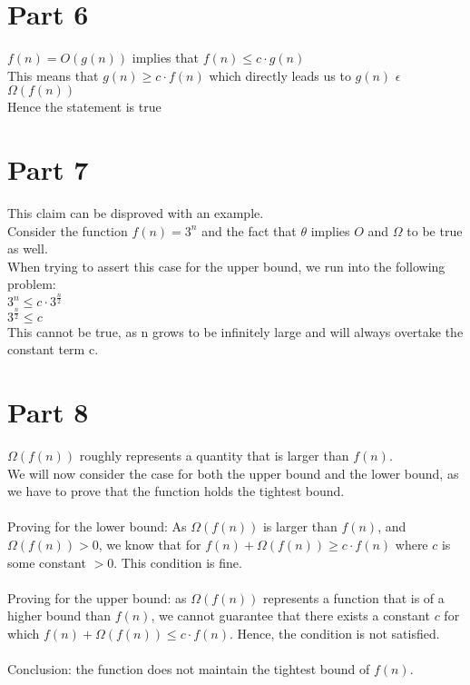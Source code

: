 \documentclass[]{article}
\begin{document}
\section{Part 6}

$ f(n) = O(g(n)) $ implies that $f(n) \leq c \cdot g(n) $ \\
This means that $g(n) \geq c \cdot f(n) $ which directly leads us to $ g(n) $ $ \epsilon $ $ \Omega (f(n)) $ \\
Hence the statement is true

\section{Part 7}
This claim can be disproved with an example. \\
Consider the function $f(n) = 3^n$ and the fact that $ \theta $ implies $O$ and $\Omega$ to be true as well. \\
When trying to assert this case for the upper bound, we run into the following problem: \\
$ 3^n \leq c \cdot 3^{\frac{n}{2}}$ \\
$ 3^{\frac{n}{2}} \leq c $ \\
This cannot be true, as n grows to be infinitely large and will always overtake the constant term c.

\section{Part 8}
$\Omega (f(n))$ roughly represents a quantity that is larger than $f(n)$. \\
We will now consider the case for both the upper bound and the lower bound, as we have to prove that the function holds the tightest bound. \\ \\
Proving for the lower bound: As $\Omega (f(n))$ is larger than $f(n)$, and $\Omega (f(n)) > 0$, we know that for $f(n) + \Omega (f(n)) \geq c \cdot f(n)$ where $c$ is some constant $> 0$. This condition is fine. \\ \\
Proving for the upper bound: as $\Omega (f(n))$ represents a function that is of a higher bound than $f(n)$, we cannot guarantee that there exists a constant $c$ for which $f(n) + \Omega (f(n)) \leq c \cdot f(n)$. Hence, the condition is not satisfied. \\ \\
Conclusion: the function does not maintain the tightest bound of $f(n)$.
\end{document}
